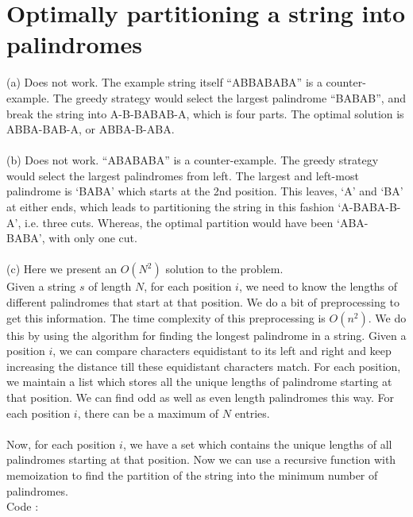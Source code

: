 \documentclass{article}
\begin{document}
\section{Optimally partitioning a string into palindromes}
(a) Does not work. The example string itself “ABBABABA” is a 
counter-example. The greedy strategy would select the largest 
palindrome “BABAB”, and break the string into A-B-BABAB-A, 
which is four parts. The optimal solution is ABBA-BAB-A, or ABBA-B-ABA.\\
\\
(b) Does not work. “ABABABA” is a counter-example. The greedy strategy 
would select the largest palindromes from left. The largest and left-most
palindrome is `BABA' which starts at the 2nd position. This leaves, `A' and
`BA' at either ends, which leads to partitioning the string in this fashion
`A-BABA-B-A', i.e. three cuts. Whereas, the optimal partition would have
been `ABA-BABA', with only one cut.\\
\\
(c) Here we present an $O(N^2)$ solution to the problem.
\\
Given a string $s$ of length $N$, for each position $i$, we need to know the lengths of different palindromes that start at that position. We do a bit of preprocessing to get this information. The time complexity of this preprocessing is $O(n^2)$. We do this by using the algorithm for finding the longest palindrome in a string. Given a position $i$, we can compare characters equidistant to its left and right and keep increasing the distance till these equidistant characters match. For each position, we maintain a list which stores all the unique lengths of palindrome starting at that position. We can find odd as well as even length palindromes this way. For each position $i$, there can be a maximum of $N$ entries. \\
\\
Now, for each position $i$, we have a set which contains the unique lengths of all palindromes starting at that position. Now we can use a recursive function with memoization to find the partition of the string into the minimum number of palindromes. 
\\
Code : 
\end{document}
